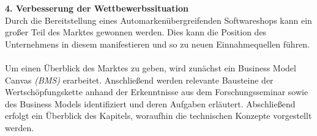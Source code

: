 \textbf{4. Verbesserung der Wettbewerbssituation}\\
Durch die Bereitstellung eines Automarkenübergreifenden Softwareshops kann ein großer Teil des Marktes gewonnen werden. Dies kann die Position des Unternehmens in diesem manifestieren und so zu neuen Einnahmequellen führen.\\\\

Um einen Überblick des Marktes zu geben, wird zunächst ein Business Model Canvas \textit{(BMS)} erarbeitet. Anschließend werden relevante Bausteine der Wertschöpfungskette anhand der Erkenntnisse aus dem Forschungsseminar sowie des Business Models identifiziert und deren Aufgaben erläutert. Abschließend erfolgt ein Überblick des Kapitels, woraufhin die technischen Konzepte vorgestellt werden.